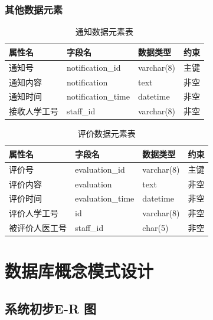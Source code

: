 \documentclass{article}
\begin{document}
\subsubsection{其他数据元素}

\begin{table}[H]
    \centering
    \begin{tabularx}{\textwidth}{|>{\raggedright\arraybackslash}X|>{\raggedright\arraybackslash}X|>{\raggedright\arraybackslash}X|>{\raggedright\arraybackslash}X|}
    \toprule
    \textbf{属性名} & \textbf{字段名} & \textbf{数据类型} & \textbf{约束} \\ \midrule
    通知号 & notification\_id & varchar(8) & 主键 \\ \midrule
    通知内容 & notification & text & 非空 \\ \midrule
    通知时间 & notification\_time & datetime & 非空 \\ \midrule
    接收人学工号 & staff\_id & varchar(8) & 非空 \\ \bottomrule
    \end{tabularx}
    \caption{通知数据元素表}
    \label{tab:notification_elements}   
\end{table}

\begin{table}[H]
    \centering
    \begin{tabularx}{\textwidth}{|>{\raggedright\arraybackslash}X|>{\raggedright\arraybackslash}X|>{\raggedright\arraybackslash}X|>{\raggedright\arraybackslash}X|}
    \toprule
    \textbf{属性名} & \textbf{字段名} & \textbf{数据类型} & \textbf{约束} \\ \midrule
    评价号 & evaluation\_id & varchar(8) & 主键 \\ \midrule
    评价内容 & evaluation & text & 非空 \\ \midrule
    评价时间 & evaluation\_time & datetime & 非空 \\ \midrule
    评价人学工号 & id & varchar(8) & 非空 \\ \midrule
    被评价人医工号 & staff\_id & char(5) & 非空 \\ \bottomrule
    \end{tabularx}
    \caption{评价数据元素表}
    \label{tab:evaluation_elements}
\end{table}

\section{数据库概念模式设计}
\subsection{系统初步E-R 图}
\end{document}
